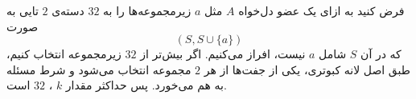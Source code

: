 \p
فرض کنید به ازای یک عضو دل‌خواه
$A$
مثل
$a$
زیرمجموعه‌ها را به
$32$
دسته‌ی
$2$
تایی به صورت
$$(S, S \cup \{a\})$$
که در آن
$S$
شامل
$a$
نیست، افراز می‌کنیم. اگر بیش‌تر از
$32$
زیرمجموعه انتخاب کنیم، طبق اصل لانه کبوتری، یکی از جفت‌ها از هر
$2$
مجموعه انتخاب می‌شود و شرط مسئله به هم می‌خورد. پس حداکثر مقدار
$k$
،
$32$
است.